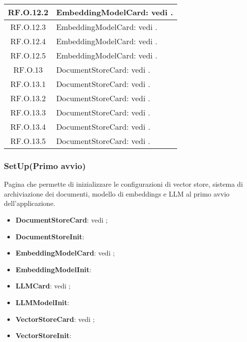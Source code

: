 \documentclass[10pt, a4paper]{article}
\begin{document}
\begin{xltabular}{\textwidth}{c|X}
\hline
RF.O.12.2 &  EmbeddingModelCard: vedi . \\
\hline
RF.O.12.3 &  EmbeddingModelCard: vedi . \\
\hline
RF.O.12.4 &  EmbeddingModelCard: vedi . \\
\hline
RF.O.12.5 &  EmbeddingModelCard: vedi . \\
\hline
RF.O.13 & DocumentStoreCard: vedi . \\ 
\hline
RF.O.13.1 & DocumentStoreCard: vedi . \\ 
\hline
RF.O.13.2 & DocumentStoreCard: vedi . \\ 
\hline
RF.O.13.3 & DocumentStoreCard: vedi . \\ 
\hline
RF.O.13.4 & DocumentStoreCard: vedi . \\ 
\hline
RF.O.13.5 & DocumentStoreCard: vedi . \\ 
\end{xltabular}



\subsubsection{SetUp(Primo avvio)}%
Pagina che permette di inizializzare le configurazioni di vector store, sistema di archiviazione dei documenti, modello di embeddings e LLM al primo avvio dell'applicazione.
\begin{itemize}
    \item \textbf{DocumentStoreCard}: vedi ;
    \item \label{DocumentStoreInit}\textbf{DocumentStoreInit}:
    \item \textbf{EmbeddingModelCard}: vedi ;
    \item \label{EmbeddingModelInit}\textbf{EmbeddingModelInit}:
    \item \textbf{LLMCard}: vedi ;
    \item \label{LLMModelInit}\textbf{LLMModelInit}:
    \item \textbf{VectorStoreCard}: vedi ;
    \item \label{VectorStoreInit}\textbf{VectorStoreInit}:
    


\end{itemize}
\end{document}
